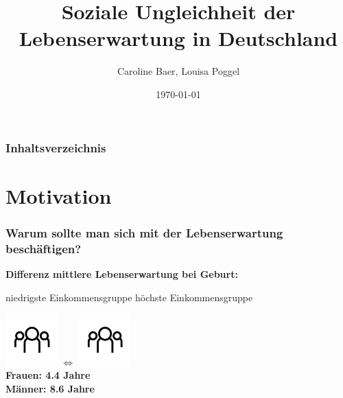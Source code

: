 \documentclass{beamer}
\title{Soziale Ungleichheit der Lebenserwartung in Deutschland}
\author{Caroline Baer, Louisa Poggel}
\date{ \today }
\begin{document}
\begin{frame}
 \maketitle
\end{frame}

\begin{frame}
 \frametitle{Inhaltsverzeichnis}
  \tableofcontents  %
\end{frame}

\section{Motivation}
\begin{frame}
 \frametitle{Warum sollte man sich mit der Lebenserwartung\\ beschäftigen?}
\textbf{Differenz mittlere Lebenserwartung bei Geburt:}

niedrigste Einkommensgruppe \hfill höchste Einkommensgruppe

\hspace{1.5cm}\includegraphics[height=2cm]{Personen}\hspace{2cm} 
$\Longleftrightarrow$ \hspace{2cm}\includegraphics[height=2cm]{Personen}\\
\vspace{0.5cm}
\hspace{4.3cm} \textbf{Frauen: 4.4 Jahre}\\
\hspace{4.3cm} \textbf{Männer: 8.6 Jahre}
     
    
\end{frame}
\end{document}
